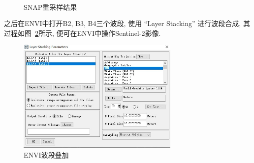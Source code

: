 \begin{figure}[!htbp]
    \centering
    \\[12pt]
    \caption{SNAP重采样结果}
    \label{fig:0208}
\end{figure}

之后在ENVI中打开B2, B3, B4三个波段, 使用 ``Layer Stacking'' 进行波段合成, 其过程如图~\ref{fig:0209}所示, 便可在ENVI中操作Sentinel-2影像.

\begin{figure}[!htbp]
    \centering
    \includegraphics[height=15em]{pic/q3_04.jpg}
    \caption{ENVI波段叠加}
    \label{fig:0209}
\end{figure}

